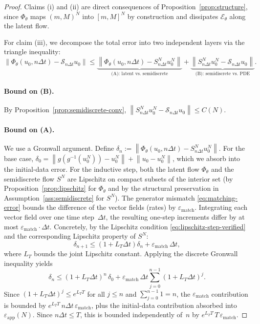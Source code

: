 \documentclass[11pt]{article}
\newcommand{\cS}{\mathcal{S}}
\newcommand{\cE}{\mathcal{E}}
\newcommand{\PhiT}{\Phi_{\theta}}
\newcommand{\norm}[1]{\left\lVert #1 \right\rVert}
\begin{document}
\begin{proof}
Claims (i) and (ii) are direct consequences of Proposition~\ref{prop:structure}, since $\PhiT$ maps $(m,M)^N$ into $[m,M]^N$ by construction and dissipates $\cE_{\theta}$ along the latent flow.

For claim (iii), we decompose the total error into two independent layers via the triangle inequality:
\begin{equation}\label{eq:transfer-decomp}
\norm{\PhiT(u_0,n\Delta t)-\cS_{n\Delta t}u_0}\le \underbrace{\norm{\PhiT(u_0,n\Delta t)-S_{n\Delta t}^Nu_0^N}}_{\text{(A): latent vs.\ semidiscrete}}+\underbrace{\norm{S_{n\Delta t}^Nu_0^N-\cS_{n\Delta t}u_0}}_{\text{(B): semidiscrete vs.\ PDE}}.
\end{equation}

\paragraph{Bound on (B).} By Proposition~\ref{prop:semidiscrete-conv}, $\norm{S_{n\Delta t}^Nu_0^N-\cS_{n\Delta t}u_0}\le C(N)$.

\paragraph{Bound on (A).} We use a Gronwall argument. Define $\delta_n:=\norm{\PhiT(u_0,n\Delta t)-S_{n\Delta t}^Nu_0^N}$. For the base case, $\delta_0=\norm{g(g^{-1}(u_0^N))-u_0^N}+ \norm{u_0-u_0^N}$, which we absorb into the initial-data error. For the inductive step, both the latent flow $\PhiT$ and the semidiscrete flow $S^N$ are Lipschitz on compact subsets of the interior set (by Proposition~\ref{prop:lipschitz} for $\PhiT$ and by the structural preservation in Assumption~\ref{ass:semidiscrete} for $S^N$). The generator mismatch \eqref{eq:matching-error} bounds the difference of the vector fields (rates) by $\varepsilon_{\mathrm{match}}$. Integrating each vector field over one time step~$\Delta t$, the resulting one-step increments differ by at most $\varepsilon_{\mathrm{match}}\cdot\Delta t$. Concretely, by the Lipschitz condition \eqref{eq:lipschitz-step-verified} and the corresponding Lipschitz property of $S^N$:
\begin{equation*}
\delta_{n+1}\le (1+L_T\Delta t)\delta_n + \varepsilon_{\mathrm{match}}\,\Delta t,
\end{equation*}
where $L_T$ bounds the joint Lipschitz constant. Applying the discrete Gronwall inequality yields
\begin{equation*}
\delta_n \le (1+L_T\Delta t)^n\,\delta_0 + \varepsilon_{\mathrm{match}}\,\Delta t \sum_{j=0}^{n-1}(1+L_T\Delta t)^j.
\end{equation*}
Since $(1+L_T\Delta t)^j\le e^{L_TT}$ for all $j\le n$ and $\sum_{j=0}^{n-1}1=n$, the $\varepsilon_{\mathrm{match}}$ contribution is bounded by $e^{L_TT}\,n\Delta t\,\varepsilon_{\mathrm{match}}$, plus the initial-data contribution absorbed into $\varepsilon_{\mathrm{app}}(N)$. Since $n\Delta t\le T$, this is bounded independently of~$n$ by $e^{L_TT}\,T\,\varepsilon_{\mathrm{match}}$.


\end{proof}
\end{document}
